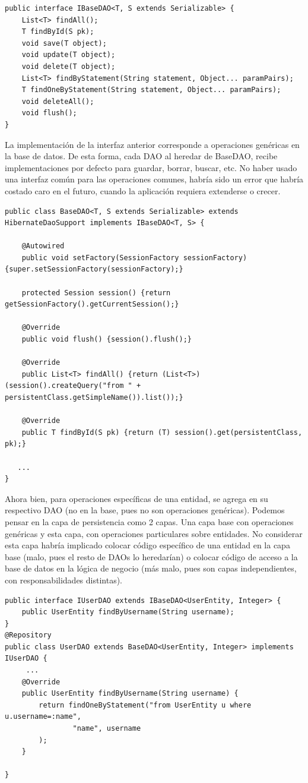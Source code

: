 \documentclass[letter]{article}
\begin{document}
\begin{lstlisting}
public interface IBaseDAO<T, S extends Serializable> {
    List<T> findAll();
    T findById(S pk);
    void save(T object);
    void update(T object);
    void delete(T object);
    List<T> findByStatement(String statement, Object... paramPairs);
    T findOneByStatement(String statement, Object... paramPairs);
    void deleteAll();
    void flush(); 
}
\end{lstlisting}

La implementación de la interfaz anterior corresponde a operaciones genéricas en la base de datos. De esta forma, cada DAO al heredar de BaseDAO, recibe implementaciones por defecto para guardar, borrar, buscar, etc. No haber usado una interfaz común para las operaciones comunes, habría sido un error que habría costado caro en el futuro, cuando la aplicación requiera extenderse o crecer.

\begin{lstlisting}
public class BaseDAO<T, S extends Serializable> extends HibernateDaoSupport implements IBaseDAO<T, S> {

    @Autowired
    public void setFactory(SessionFactory sessionFactory) {super.setSessionFactory(sessionFactory);}

    protected Session session() {return getSessionFactory().getCurrentSession();}

    @Override
    public void flush() {session().flush();}

    @Override
    public List<T> findAll() {return (List<T>) (session().createQuery("from " + persistentClass.getSimpleName()).list());}

    @Override
    public T findById(S pk) {return (T) session().get(persistentClass, pk);}

   ...
}

\end{lstlisting}

Ahora bien, para operaciones específicas de una entidad, se agrega en su respectivo DAO (no en la base, pues no son operaciones genéricas). Podemos pensar en la capa de persistencia como 2 capas. Una capa base con operaciones genéricas y esta capa, con operaciones particulares sobre entidades. No considerar esta capa habría implicado colocar código específico de una entidad en la capa base (malo, pues el resto de DAOs lo heredarían) o colocar código de acceso a la base de datos en la lógica de negocio (más malo, pues son capas independientes, con responsabilidades distintas).
\begin{lstlisting}
public interface IUserDAO extends IBaseDAO<UserEntity, Integer> {
    public UserEntity findByUsername(String username);
}
@Repository
public class UserDAO extends BaseDAO<UserEntity, Integer> implements IUserDAO {
     ...
    @Override
    public UserEntity findByUsername(String username) {
        return findOneByStatement("from UserEntity u where u.username=:name",
                "name", username
        );
    }

}
\end{lstlisting}
\end{document}

